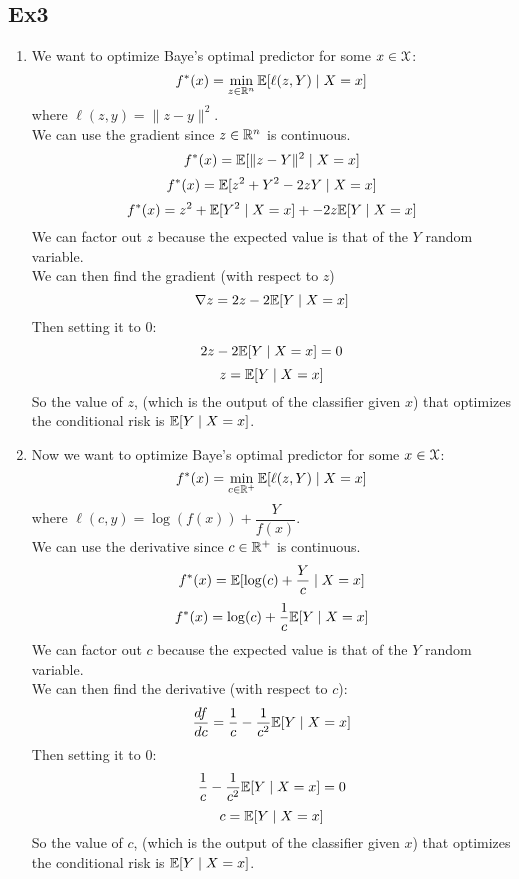 \documentclass[12pt]{article}
\begin{document}
\newpage

\subsection*{Ex3}

\begin{enumerate}[label=\alph*)]
    \item 
    We want to optimize
    Baye's optimal predictor for
    some $x \in \mathcal{X}$:
    \[ f^*(x) = \min_{z \in \mathbb{R}^n}
    \mathbb{E}[\ell(z, Y) \mid X = x] \]
    where $\ell(z, y) = \| z - y\|^2$. \\
    We can use the gradient
    since $z \in \mathbb{R}^n$ is continuous. \\
    \[ f^*(x)
    = \mathbb{E}[ \| z - Y\|^2 \mid X = x] \]
    \[ f^*(x)
    = \mathbb{E}[z^2 + Y^2 -2zY \mid X = x] \]
    \[ f^*(x)
    = z^2 + \mathbb{E}[Y^2 \mid X = x]
    + -2z\mathbb{E}[Y \mid X = x] \]
    We can factor out $z$ because the expected
    value is that of the $Y$ random variable. \\
    We can then find the gradient
    (with respect to $z$)
    \[ \nabla z = 2z - 2\mathbb{E}[Y \mid X = x] \]
    Then setting it to $0$:
    \[ 2z - 2\mathbb{E}[Y \mid X = x] = 0\]
    \[ z = \mathbb{E}[Y \mid X = x] \]
    So the value of $z$,
    (which is the output of the classifier
    given $x$)
    that optimizes the conditional risk
    is $\mathbb{E}[Y \mid X = x]$.
    \item 
    Now we want to optimize
    Baye's optimal predictor for
    some $x \in \mathcal{X}$:
    \[ f^*(x) = \min_{c \in \mathbb{R}^+}
    \mathbb{E}[\ell(z, Y) \mid X = x] \]
    where $\ell(c, y) = \log(f(x)) + \dfrac{Y}{f(x)}$. \\
    We can use the derivative
    since $c \in \mathbb{R}^+$ is continuous. \\
    \[ f^*(x)
    = \mathbb{E}[ \log(c) + \dfrac{Y}{c} \mid X = x] \]
    \[ f^*(x)
    = \log(c) + \dfrac{1}{c}\mathbb{E}[Y \mid X = x] \]
    We can factor out $c$ because the expected
    value is that of the $Y$ random variable. \\
    We can then find the derivative
    (with respect to $c$):
    \[ \dfrac{df}{dc} = \dfrac{1}{c} - 
    \dfrac{1}{c^2}\mathbb{E}[Y \mid X = x] \]
    Then setting it to $0$:
    \[ \dfrac{1}{c} - 
    \dfrac{1}{c^2}\mathbb{E}[Y \mid X = x] = 0 \]
    \[ c = \mathbb{E}[Y \mid X = x] \]
    So the value of $c$,
    (which is the output of the classifier
    given $x$)
    that optimizes the conditional risk
    is $\mathbb{E}[Y \mid X = x]$.
\end{enumerate}

\begingroup
\color{red}
\end{document}
